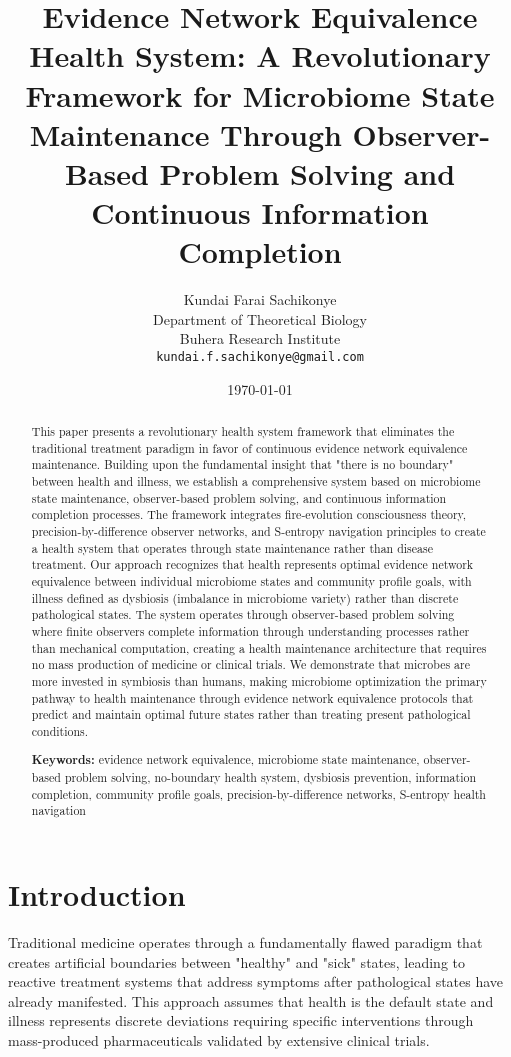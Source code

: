 \documentclass[12pt,a4paper]{article}
\title{Evidence Network Equivalence Health System: A Revolutionary Framework for Microbiome State Maintenance Through Observer-Based Problem Solving and Continuous Information Completion}
\author{Kundai Farai Sachikonye\\
Department of Theoretical Biology\\
Buhera Research Institute\\
\texttt{kundai.f.sachikonye@gmail.com}}
\date{\today}
\begin{document}
\maketitle

\begin{abstract}
This paper presents a revolutionary health system framework that eliminates the traditional treatment paradigm in favor of continuous evidence network equivalence maintenance. Building upon the fundamental insight that "there is no boundary" between health and illness, we establish a comprehensive system based on microbiome state maintenance, observer-based problem solving, and continuous information completion processes. The framework integrates fire-evolution consciousness theory, precision-by-difference observer networks, and S-entropy navigation principles to create a health system that operates through state maintenance rather than disease treatment. Our approach recognizes that health represents optimal evidence network equivalence between individual microbiome states and community profile goals, with illness defined as dysbiosis (imbalance in microbiome variety) rather than discrete pathological states. The system operates through observer-based problem solving where finite observers complete information through understanding processes rather than mechanical computation, creating a health maintenance architecture that requires no mass production of medicine or clinical trials. We demonstrate that microbes are more invested in symbiosis than humans, making microbiome optimization the primary pathway to health maintenance through evidence network equivalence protocols that predict and maintain optimal future states rather than treating present pathological conditions.

\textbf{Keywords:} evidence network equivalence, microbiome state maintenance, observer-based problem solving, no-boundary health system, dysbiosis prevention, information completion, community profile goals, precision-by-difference networks, S-entropy health navigation
\end{abstract}

\section{Introduction}

Traditional medicine operates through a fundamentally flawed paradigm that creates artificial boundaries between "healthy" and "sick" states, leading to reactive treatment systems that address symptoms after pathological states have already manifested. This approach assumes that health is the default state and illness represents discrete deviations requiring specific interventions through mass-produced pharmaceuticals validated by extensive clinical trials.
\end{document}
